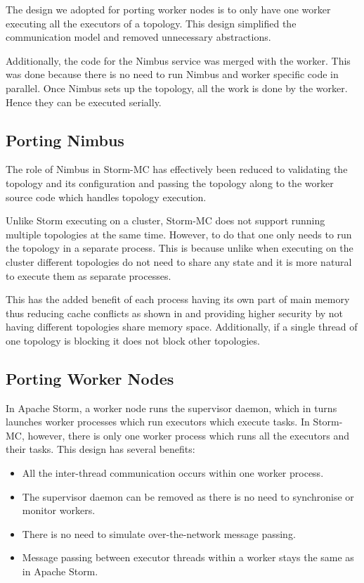 The design we adopted for porting worker nodes is to only have one worker executing all the executors of a topology. This design simplified the communication model and removed unnecessary abstractions.

Additionally, the code for the Nimbus service was merged with the worker. This was done because there is no need to run Nimbus and worker specific code in parallel. Once Nimbus sets up the topology, all the work is done by the worker. Hence they can be executed serially.

\subsection{Porting Nimbus}

The role of Nimbus in Storm-MC has effectively been reduced to validating the topology and its configuration and passing the topology along to the worker source code which handles topology execution.

Unlike Storm executing on a cluster, Storm-MC does not support running multiple topologies at the same time. However, to do that one only needs to run the topology in a separate process. This is because unlike when executing on the cluster different topologies do not need to share any state and it is more natural to execute them as separate processes.

This has the added benefit of each process having its own part of main memory thus reducing cache conflicts as shown in \citep{Chandra:2005:PIC:1042442.1043432} and providing higher security by not having different topologies share memory space. Additionally, if a single thread of one topology is blocking it does not block other topologies.

\subsection{Porting Worker Nodes}

In Apache Storm, a worker node runs the supervisor daemon, which in turns launches worker processes which run executors which execute tasks. In Storm-MC, however, there is only one worker process which runs all the executors and their tasks. This design has several benefits:

\begin{itemize}
	\item All the inter-thread communication occurs within one worker process.
	\item The supervisor daemon can be removed as there is no need to synchronise or monitor workers.
	\item There is no need to simulate over-the-network message passing.
	\item Message passing between executor threads within a worker stays the same as in Apache Storm.
\end{itemize}


